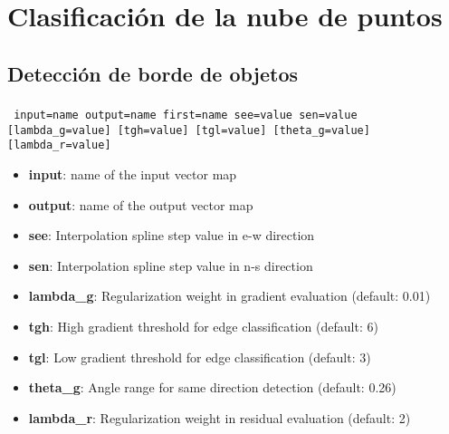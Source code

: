 \section{Clasificación de la nube de puntos}
\subsection{Detección de borde de objetos}
\begin{frame}[shrink=02]
 \frametitle{}
\begin{beamerboxesrounded}[shadow=true]{\textbf{}\texttt{ input=name output=name first=name see=value sen=value [lambda\_g=value] [tgh=value] [tgl=value] [theta\_g=value] [lambda\_r=value]}}
\begin{itemize}
 \item \textbf{input}: name of the input vector map
 \item \textbf{output}: name of the output vector map
 \item \textbf{see}: Interpolation spline step value in e-w direction
 \item \textbf{sen}: Interpolation spline step value in n-s direction
 \item \textbf{lambda\_g}: Regularization weight in gradient evaluation (default: 0.01)
 \item \textbf{tgh}: High gradient threshold for edge classification (default: 6)
 \item \textbf{tgl}: Low gradient threshold for edge classification (default: 3)
 \item \textbf{theta\_g}: Angle range for same direction detection (default: 0.26)
 \item \textbf{lambda\_r}: Regularization weight in residual evaluation (default: 2)
\end{itemize}
\end{beamerboxesrounded}
\vedge
\end{frame}
\pgfdeclareimage[width=0.5\textwidth]{edge}{images/edge}
